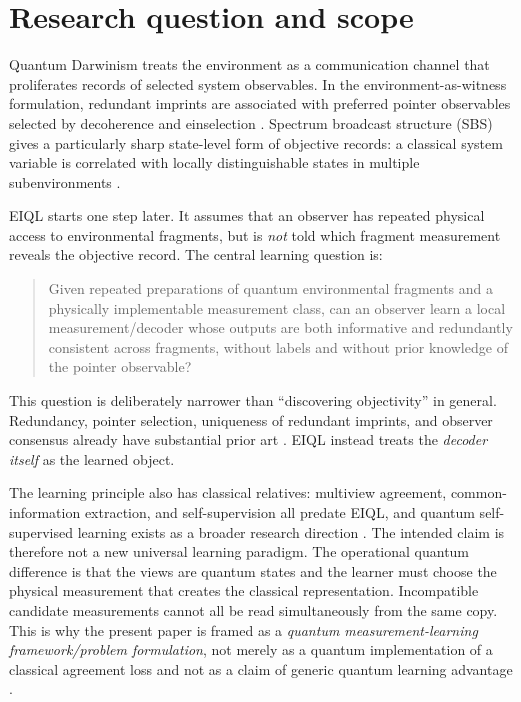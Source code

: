 \section{Research question and scope}

Quantum Darwinism treats the environment as a communication channel that proliferates records of selected system observables. In the environment-as-witness formulation, redundant imprints are associated with preferred pointer observables selected by decoherence and einselection \cite{ollivier2004,ollivier2005,zurek2003}. Spectrum broadcast structure (SBS) gives a particularly sharp state-level form of objective records: a classical system variable is correlated with locally distinguishable states in multiple subenvironments \cite{horodecki2015,le2019}.

EIQL starts one step later. It assumes that an observer has repeated physical access to environmental fragments, but is \emph{not} told which fragment measurement reveals the objective record. The central learning question is:

\begin{quote}
Given repeated preparations of quantum environmental fragments and a physically implementable measurement class, can an observer learn a local measurement/decoder whose outputs are both informative and redundantly consistent across fragments, without labels and without prior knowledge of the pointer observable?
\end{quote}

This question is deliberately narrower than ``discovering objectivity'' in general. Redundancy, pointer selection, uniqueness of redundant imprints, and observer consensus already have substantial prior art \cite{ollivier2004,fu2021,touil2025}. EIQL instead treats the \emph{decoder itself} as the learned object.

The learning principle also has classical relatives: multiview agreement, common-information extraction, and self-supervision all predate EIQL, and quantum self-supervised learning exists as a broader research direction \cite{gacs1973,jaderberg2021}. The intended claim is therefore not a new universal learning paradigm. The operational quantum difference is that the views are quantum states and the learner must choose the physical measurement that creates the classical representation. Incompatible candidate measurements cannot all be read simultaneously from the same copy. This is why the present paper is framed as a \emph{quantum measurement-learning framework/problem formulation}, not merely as a quantum implementation of a classical agreement loss and not as a claim of generic quantum learning advantage \cite{ciliberto2018}.

